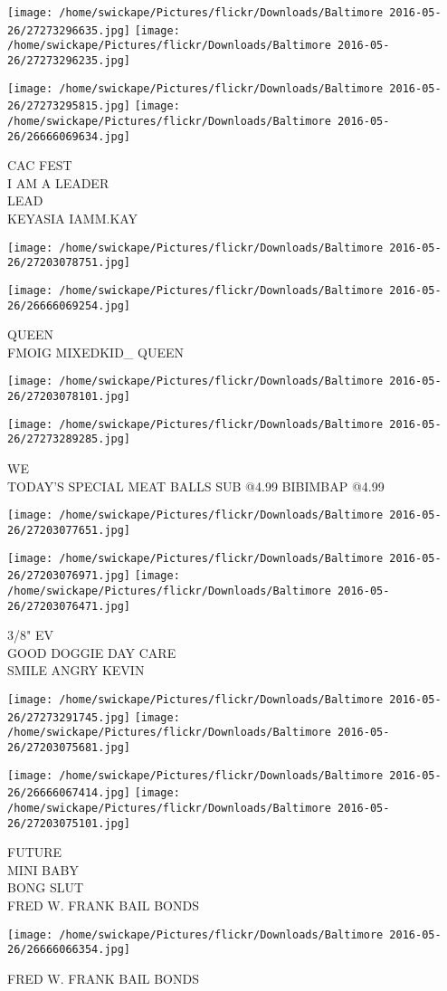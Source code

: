 \documentclass[10pt,letterpaper]{article}
\begin{document}
\texttt{[image: /home/swickape/Pictures/flickr/Downloads/Baltimore 2016-05-26/27273296635.jpg]}
\texttt{[image: /home/swickape/Pictures/flickr/Downloads/Baltimore 2016-05-26/27273296235.jpg]}

\texttt{[image: /home/swickape/Pictures/flickr/Downloads/Baltimore 2016-05-26/27273295815.jpg]}
\texttt{[image: /home/swickape/Pictures/flickr/Downloads/Baltimore 2016-05-26/26666069634.jpg]}

CAC FEST\\
I AM A LEADER\\
LEAD\\
KEYASIA IAMM.KAY
\pagebreak

\texttt{[image: /home/swickape/Pictures/flickr/Downloads/Baltimore 2016-05-26/27203078751.jpg]}

\vspace{0.25in}
\texttt{[image: /home/swickape/Pictures/flickr/Downloads/Baltimore 2016-05-26/26666069254.jpg]}

QUEEN\\
FMOIG MIXEDKID\_ QUEEN
\pagebreak

\texttt{[image: /home/swickape/Pictures/flickr/Downloads/Baltimore 2016-05-26/27203078101.jpg]}

\vspace{0.25in}
\texttt{[image: /home/swickape/Pictures/flickr/Downloads/Baltimore 2016-05-26/27273289285.jpg]}

WE\\
TODAY'S SPECIAL MEAT BALLS SUB @4.99 BIBIMBAP @4.99
\pagebreak

\texttt{[image: /home/swickape/Pictures/flickr/Downloads/Baltimore 2016-05-26/27203077651.jpg]}

\vspace{0.25in}
\texttt{[image: /home/swickape/Pictures/flickr/Downloads/Baltimore 2016-05-26/27203076971.jpg]}
\texttt{[image: /home/swickape/Pictures/flickr/Downloads/Baltimore 2016-05-26/27203076471.jpg]}

3/8" EV\\
GOOD DOGGIE DAY CARE\\
SMILE ANGRY KEVIN
\pagebreak

\texttt{[image: /home/swickape/Pictures/flickr/Downloads/Baltimore 2016-05-26/27273291745.jpg]}
\texttt{[image: /home/swickape/Pictures/flickr/Downloads/Baltimore 2016-05-26/27203075681.jpg]}

\texttt{[image: /home/swickape/Pictures/flickr/Downloads/Baltimore 2016-05-26/26666067414.jpg]}
\texttt{[image: /home/swickape/Pictures/flickr/Downloads/Baltimore 2016-05-26/27203075101.jpg]}

FUTURE\\
MINI BABY\\
BONG SLUT\\
FRED W. FRANK BAIL BONDS
\pagebreak

\texttt{[image: /home/swickape/Pictures/flickr/Downloads/Baltimore 2016-05-26/26666066354.jpg]}

FRED W. FRANK BAIL BONDS
\pagebreak
\end{document}
